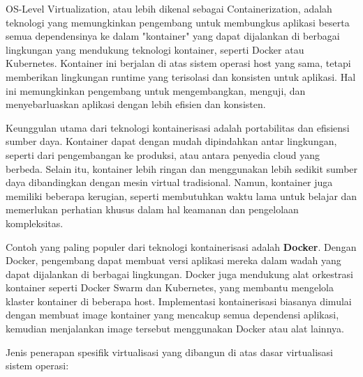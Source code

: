 \documentclass[12pt]{article}
\begin{document}
\begin{enumerate}
    \par OS-Level Virtualization, atau lebih dikenal sebagai Containerization, adalah teknologi yang memungkinkan pengembang untuk membungkus aplikasi beserta semua dependensinya ke dalam "kontainer" yang dapat dijalankan di berbagai lingkungan yang mendukung teknologi kontainer, seperti Docker atau Kubernetes. Kontainer ini berjalan di atas sistem operasi host yang sama, tetapi memberikan lingkungan runtime yang terisolasi dan konsisten untuk aplikasi. Hal ini memungkinkan pengembang untuk mengembangkan, menguji, dan menyebarluaskan aplikasi dengan lebih efisien dan konsisten.

    \par Keunggulan utama dari teknologi kontainerisasi adalah portabilitas dan efisiensi sumber daya. Kontainer dapat dengan mudah dipindahkan antar lingkungan, seperti dari pengembangan ke produksi, atau antara penyedia cloud yang berbeda. Selain itu, kontainer lebih ringan dan menggunakan lebih sedikit sumber daya dibandingkan dengan mesin virtual tradisional. Namun, kontainer juga memiliki beberapa kerugian, seperti membutuhkan waktu lama untuk belajar dan memerlukan perhatian khusus dalam hal keamanan dan pengelolaan kompleksitas.
    
    \par Contoh yang paling populer dari teknologi kontainerisasi adalah \textbf{Docker}. Dengan Docker, pengembang dapat membuat versi aplikasi mereka dalam wadah yang dapat dijalankan di berbagai lingkungan. Docker juga mendukung alat orkestrasi kontainer seperti Docker Swarm dan Kubernetes, yang membantu mengelola klaster kontainer di beberapa host. Implementasi kontainerisasi biasanya dimulai dengan membuat image kontainer yang mencakup semua dependensi aplikasi, kemudian menjalankan image tersebut menggunakan Docker atau alat lainnya.
\end{enumerate}

\par Jenis penerapan spesifik virtualisasi yang dibangun di atas dasar virtualisasi sistem operasi:
\end{document}
